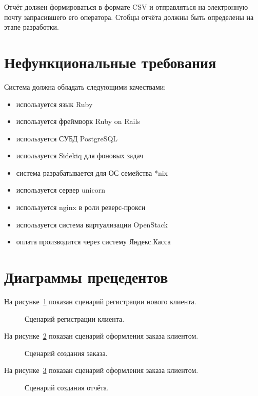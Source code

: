 Отчёт должен формироваться в формате CSV и отправляться на электронную почту запрасившего его оператора. Стобцы отчёта должны быть определены на этапе разработки.

\section{Нефункциональные требования}\label{sec:ch2/sec3}
Система должна обладать следующими качествами:
\begin{itemize}
  \item используется язык Ruby
  \item используется фреймворк Ruby on Rails
  \item используется СУБД PostgreSQL
  \item используется Sidekiq для фоновых задач
  \item система разрабатывается для ОС семейства *nix
  \item используется сервер unicorn
  \item используется nginx в роли реверс-прокси
  \item используется система виртуализации OpenStack
  \item оплата производится через систему Яндекс.Касса
\end{itemize}

\section{Диаграммы прецедентов}\label{sec:ch2/sec4}
На рисунке~\ref{fig:umls_register_ucesace} показан сценарий регистрации нового клиента.
\begin{figure}[ht]
  \caption{Сценарий регистрации клиента.}\label{fig:umls_register_ucesace}
\end{figure}

На рисунке~\ref{fig:umls_make_order_usecase} показан сценарий оформления заказа клиентом.
\begin{figure}[ht]
  \caption{Сценарий создания заказа.}\label{fig:umls_make_order_usecase}
\end{figure}

На рисунке~\ref{fig:umls_report_request_usecase} показан сценарий оформления заказа клиентом.
\begin{figure}[ht]
  \caption{Сценарий создания отчёта.}\label{fig:umls_report_request_usecase}
\end{figure}